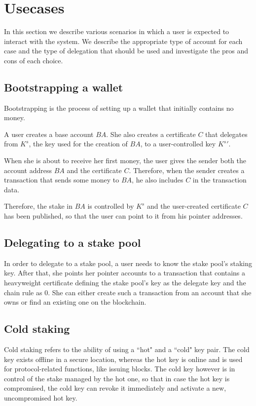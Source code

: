 \section{Usecases}

In this section we describe various scenarios in which a user is expected to interact with the system. We describe the appropriate type of account for each case and the type of delegation that should be used and investigate the pros and cons of each choice.

\subsection{Bootstrapping a wallet}

Bootstrapping is the process of setting up a wallet that initially contains no money.

A user creates a base account $BA$. She also creates a certificate $C$ that delegates from $K^s$, the key used for the creation of $BA$, to a user-controlled key ${K^s}'$.

When she is about to receive her first money, the user gives the sender both the account address $BA$ and the certificate $C$. Therefore, when the sender creates a transaction that sends some money to $BA$, he also includes $C$ in the transaction data.

Therefore, the stake in $BA$ is controlled by $K^s$ and the user-created certificate $C$ has been published, so that the user can point to it from his pointer addresses.

\subsection{Delegating to a stake pool}

In order to delegate to a stake pool, a user needs to know the stake pool's staking key. After that, she points her pointer accounts to a transaction that contains a heavyweight certificate defining the stake pool's key as the delegate key and the chain rule as 0. She can either create such a transaction from an account that she owns or find an existing one on the blockchain.

\subsection{Cold staking}

Cold staking refers to the ability of using a ``hot" and a ``cold" key pair. The cold key exists offline in a secure location, whereas the hot key is online and is used for protocol-related functions, like issuing blocks. The cold key however is in control of the stake managed by the hot one, so that in case the hot key is compromised, the cold key can revoke it immediately and activate a new, uncompromised hot key.

